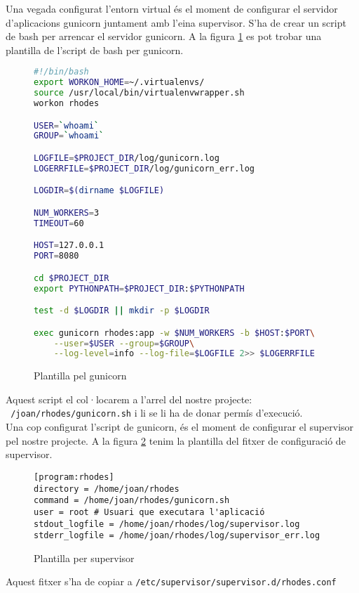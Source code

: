 Una vegada configurat l'entorn virtual és el moment de configurar el servidor d'aplicacions gunicorn juntament amb l'eina supervisor. S'ha de crear un script de bash per arrencar el servidor gunicorn. A la figura \ref{fig:gunicorn} es pot trobar una plantilla de l'script de bash per gunicorn.\\

\begin{figure}[h!]
	\begin{lstlisting}[language=bash]
#!/bin/bash
export WORKON_HOME=~/.virtualenvs/
source /usr/local/bin/virtualenvwrapper.sh
workon rhodes

USER=`whoami`
GROUP=`whoami`

LOGFILE=$PROJECT_DIR/log/gunicorn.log
LOGERRFILE=$PROJECT_DIR/log/gunicorn_err.log

LOGDIR=$(dirname $LOGFILE)

NUM_WORKERS=3
TIMEOUT=60

HOST=127.0.0.1
PORT=8080

cd $PROJECT_DIR
export PYTHONPATH=$PROJECT_DIR:$PYTHONPATH

test -d $LOGDIR || mkdir -p $LOGDIR

exec gunicorn rhodes:app -w $NUM_WORKERS -b $HOST:$PORT\
    --user=$USER --group=$GROUP\
    --log-level=info --log-file=$LOGFILE 2>> $LOGERRFILE
	\end{lstlisting}
	\caption{Plantilla pel gunicorn}
	\label{fig:gunicorn}
\end{figure}
Aquest script el col·locarem a l'arrel del nostre projecte: \texttt{~/joan/rhodes/gunicorn.sh} i li se li ha de donar permís d'execució.\\

Una cop configurat l'script de gunicorn, és el moment de configurar el supervisor pel nostre projecte. A la figura \ref{fig:supervisor} tenim la plantilla del fitxer de configuració de supervisor.
\begin{figure}[h!]
	\begin{verbatim}
[program:rhodes]
directory = /home/joan/rhodes
command = /home/joan/rhodes/gunicorn.sh
user = root # Usuari que executara l'aplicació
stdout_logfile = /home/joan/rhodes/log/supervisor.log
stderr_logfile = /home/joan/rhodes/log/supervisor_err.log
	\end{verbatim}
	\caption{Plantilla per supervisor}
	\label{fig:supervisor}
\end{figure}

Aquest fitxer s'ha de copiar a \texttt{/etc/supervisor/supervisor.d/rhodes.conf}

